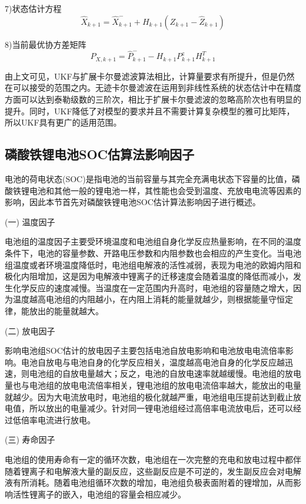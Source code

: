 7)状态估计方程
\begin{equation}
{\widehat X_{k + 1}} = \widehat X_{k + 1}^ -  + {H_{k + 1}}({Z_{k + 1}} - {\widehat Z_{k + 1}})
\end{equation} 

8)当前最优协方差矩阵
\begin{equation}
{P_{X,k + 1}} = \widehat P_{k + 1}^ -  - {H_{k + 1}}P_{k + 1}^zH_{k + 1}^T
\end{equation} 

由上文可见，UKF与扩展卡尔曼滤波算法相比，计算量要求有所提升，但是仍然在可以接受的范围之内。无迹卡尔曼滤波在运用到非线性系统的状态估计中在精度方面可以达到泰勒级数的三阶次，相比于扩展卡尔曼滤波的忽略高阶次也有明显的提升。同时，UKF降低了对模型的要求并且不需要计算复杂模型的雅可比矩阵，所以UKF具有更广的适用范围。
\subsection{磷酸铁锂电池SOC估算法影响因子}
电池的荷电状态(SOC)是指电池的当前容量与其完全充满电状态下容量的比值，磷酸铁锂电池和其他一般的锂电池一样，其性能也会受到温度、充放电电流等因素的影响，因此本节首先对磷酸铁锂电池SOC估计算法影响因子进行概述。

(一)	温度因子

	电池组的温度因子主要受环境温度和电池组自身化学反应热量影响，在不同的温度条件下，电池的容量参数、开路电压参数和内阻参数也会相应的产生变化。当电池组温度或者环境温度降低时，电池组电解液的活性减弱，表现为电池的欧姆内阻和极化内阻增加，这是因为电解液中锂离子的迁移速度会随着温度的降低而减小，发生化学反应的速度减慢。当温度在一定范围内升高时，电池组的容量随之增大，因为温度越高电池组的内阻越小，在内阻上消耗的能量就越少，则根据能量守恒定律，能放出的能量就越大。

(二)	放电因子

	影响电池组SOC估计的放电因子主要包括电池自放电影响和电池放电电流倍率影响。电池自放电与电池自身的化学反应相关，温度越高电池自身的化学反应越迅速，则电池组的自放电量越大；反之，电池的自放电速率就越缓慢。电池组的放电量也与电池组的放电电流倍率相关，锂电池组的放电电流倍率越大，能放出的电量就越少。因为大电流放电时，电池组的极化就越严重，电池组电压提前达到截止放电值，所以放出的电量减少。针对同一锂电池组经过高倍率电流放电后，还可以经过低倍率电流进行放电。

(三)	寿命因子

	电池组的使用寿命有一定的循环次数，电池组在一次完整的充电和放电过程中都伴随着锂离子和电解液大量的副反应，这些副反应是不可逆的，发生副反应会对电解液有所消耗。随着电池组循环次数的增加，电池组负极表面附着的锂增加，从而影响活性锂离子的嵌入，电池组的容量会相应减少。
